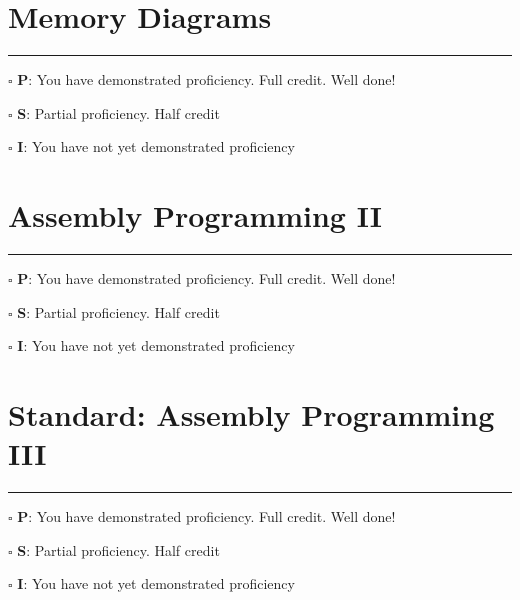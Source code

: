 \documentclass[12pt]{article}
\begin{document}


\section*{Memory Diagrams}

\vfill

\rule[1ex]{\textwidth}{.1pt}

$\square$ \textbf{P}: You have demonstrated proficiency. Full credit. Well done!

$\square$ \textbf{S}: Partial proficiency. Half credit

$\square$ \textbf{I}: You have not yet demonstrated proficiency

\newpage



\section*{Assembly Programming II}

\vfill

\rule[1ex]{\textwidth}{.1pt}

$\square$ \textbf{P}: You have demonstrated proficiency. Full credit. Well done!

$\square$ \textbf{S}: Partial proficiency. Half credit

$\square$ \textbf{I}: You have not yet demonstrated proficiency

\newpage

\section*{Standard: Assembly Programming III}



\vfill

\rule[1ex]{\textwidth}{.1pt}

$\square$ \textbf{P}: You have demonstrated proficiency. Full credit. Well done!

$\square$ \textbf{S}: Partial proficiency. Half credit

$\square$ \textbf{I}: You have not yet demonstrated proficiency

\newpage

\end{document}
